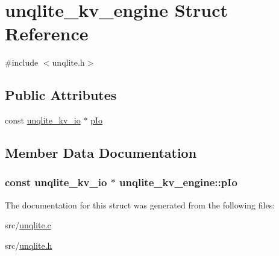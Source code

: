 \hypertarget{structunqlite__kv__engine}{\section{unqlite\-\_\-kv\-\_\-engine Struct Reference}
\label{da/dce/structunqlite__kv__engine}
}


{\ttfamily \#include $<$unqlite.\-h$>$}

\subsection*{Public Attributes}
\begin{DoxyCompactItemize}
\item 
const \hyperlink{structunqlite__kv__io}{unqlite\-\_\-kv\-\_\-io} $\ast$ \hyperlink{structunqlite__kv__engine_a08632b59a9926fa9830c6c28d9b7445a}{p\-Io}
\end{DoxyCompactItemize}


\subsection{Member Data Documentation}
\hypertarget{structunqlite__kv__engine_a08632b59a9926fa9830c6c28d9b7445a}{
\subsubsection[{p\-Io}]{\setlength{\rightskip}{0pt plus 5cm}const {\bf unqlite\-\_\-kv\-\_\-io} $\ast$ unqlite\-\_\-kv\-\_\-engine\-::p\-Io}}\label{da/dce/structunqlite__kv__engine_a08632b59a9926fa9830c6c28d9b7445a}


The documentation for this struct was generated from the following files\-:\begin{DoxyCompactItemize}
\item 
src/\hyperlink{unqlite_8c}{unqlite.\-c}\item 
src/\hyperlink{unqlite_8h}{unqlite.\-h}\end{DoxyCompactItemize}
